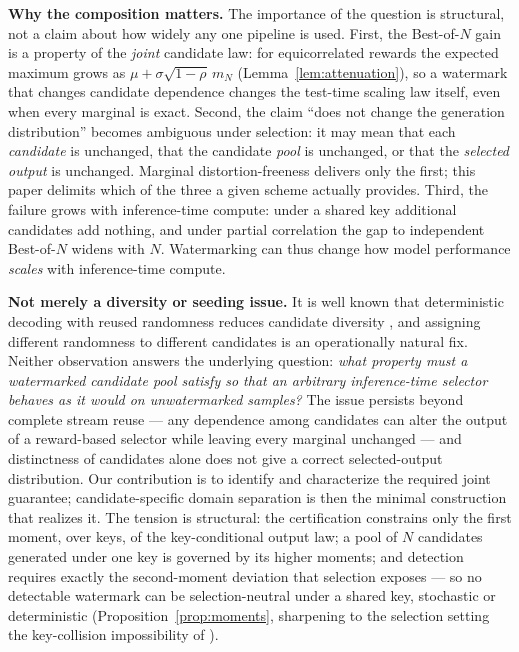 \documentclass{article} %
\begin{document}
\textbf{Why the composition matters.} The importance of the question is
structural, not a claim about how widely any one pipeline is used. First, the
Best-of-$N$ gain is a property of the \emph{joint} candidate law: for
equicorrelated rewards the expected maximum grows as
$\mu+\sigma\sqrt{1-\rho}\,m_N$ (Lemma~\ref{lem:attenuation}), so a watermark
that changes candidate dependence changes the test-time scaling law itself,
even when every marginal is exact. Second, the claim ``does not change the
generation distribution'' becomes ambiguous under selection: it may mean that
each \emph{candidate} is unchanged, that the candidate \emph{pool} is
unchanged, or that the \emph{selected output} is unchanged. Marginal
distortion-freeness delivers only the first; this paper delimits which of the
three a given scheme actually provides. Third, the failure grows with
inference-time compute: under a shared key additional candidates add nothing,
and under partial correlation the gap to independent Best-of-$N$ widens with
$N$. Watermarking can thus change how model performance \emph{scales} with
inference-time compute.

\textbf{Not merely a diversity or seeding issue.} It is well known that
deterministic decoding with reused randomness reduces candidate diversity
\citep{verma2025watermarking}, and assigning different randomness to
different candidates is an operationally natural fix. Neither observation
answers the underlying question: \emph{what property must a watermarked
candidate pool satisfy so that an arbitrary inference-time selector behaves
as it would on unwatermarked samples?} The issue persists beyond complete
stream reuse --- any dependence among candidates can alter the output of a
reward-based selector while leaving every marginal unchanged --- and
distinctness of candidates alone does not give a correct selected-output
distribution. Our contribution is to identify and characterize the required
joint guarantee; candidate-specific domain separation is then the minimal
construction that realizes it. The tension is structural: the certification
constrains only the first moment, over keys, of the key-conditional output
law; a pool of $N$ candidates generated under one key is governed by its
higher moments; and detection requires exactly the second-moment deviation
that selection exposes --- so no detectable watermark can be
selection-neutral under a shared key, stochastic or deterministic
(Proposition~\ref{prop:moments}, sharpening to the selection setting the
key-collision impossibility of \citealp{keycollision2024}).
\end{document}
